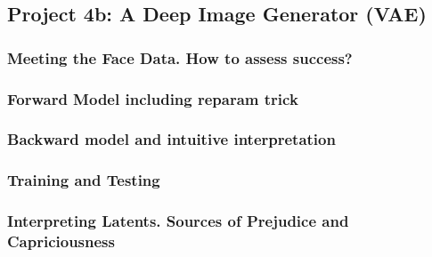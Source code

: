 \subsection*{Project 4b: A Deep Image Generator (VAE)}

\subsubsection*{Meeting the Face Data.  How to assess success?} %
\subsubsection*{Forward Model including reparam trick}
\subsubsection*{Backward model and intuitive interpretation}
\subsubsection*{Training and Testing}
\subsubsection*{Interpreting Latents.  Sources of Prejudice and Capriciousness}
